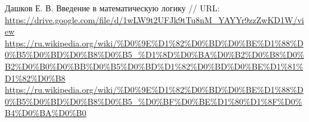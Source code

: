 \documentclass{article}
\begin{document}
  \vfill
  \begin{thebibliography}{9}
     Дашков Е. В. Введение в математическую логику // URL: \url{https://drive.google.com/file/d/1wLW9t2UFJk9tTu8nM_YAYYr9zzZwKD1W/view}
     \url{https://ru.wikipedia.org/wiki/%D0%9E%D1%82%D0%BD%D0%BE%D1%88%D0%B5%D0%BD%D0%B8%D0%B5_%D1%8D%D0%BA%D0%B2%D0%B8%D0%B2%D0%B0%D0%BB%D0%B5%D0%BD%D1%82%D0%BD%D0%BE%D1%81%D1%82%D0%B8}
     \url{https://ru.wikipedia.org/wiki/%D0%9E%D1%82%D0%BD%D0%BE%D1%88%D0%B5%D0%BD%D0%B8%D0%B5_%D0%BF%D0%BE%D1%80%D1%8F%D0%B4%D0%BA%D0%B0}
  \end{thebibliography}
\end{document}
